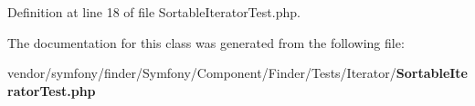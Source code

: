 Definition at line 18 of file Sortable\+Iterator\+Test.\+php.



The documentation for this class was generated from the following file\+:\begin{DoxyCompactItemize}
\item 
vendor/symfony/finder/\+Symfony/\+Component/\+Finder/\+Tests/\+Iterator/{\bf Sortable\+Iterator\+Test.\+php}\end{DoxyCompactItemize}
